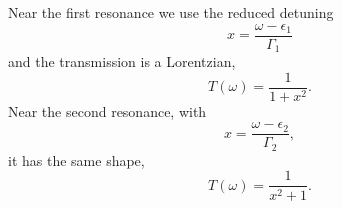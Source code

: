 \documentclass{article}
\begin{document}
Near the first resonance we use the reduced detuning
\begin{equation}
x = \frac{\omega-\epsilon_1}{\Gamma_1}
\label{eq:x1}
\end{equation}
and the transmission is a Lorentzian,
\begin{equation}
T(\omega) = \frac{1}{1+x^2} .
\label{eq:t1}
\end{equation}
Near the second resonance, with
\begin{equation}
x = \frac{\omega-\epsilon_2}{\Gamma_2} ,
\label{eq:x2}
\end{equation}
it has the same shape,
\begin{equation}
T(\omega) = \frac{1}{x^2+1} .
\label{eq:t2}
\end{equation}
\end{document}
